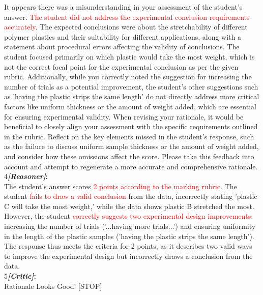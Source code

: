 \begin{figure*}
\begin{tcolorbox}[
    colback=gray!10,      %
    colframe=gray!80,     %
    title=Case Study 4,
    fonttitle=\bfseries,  %
    rounded corners,
    boxrule=0.5mm,        %
    width=\linewidth
]
 It appears there was a misunderstanding in your assessment of the student's answer. \textcolor{red}{The student did not address the experimental conclusion requirements accurately}. The expected conclusions were about the stretchability of different polymer plastics and their suitability for different applications, along with a statement about procedural errors affecting the validity of conclusions. The student focused primarily on which plastic would take the most weight, which is not the correct focal point for the experimental conclusion as per the given rubric. Additionally, while you correctly noted the suggestion for increasing the number of trials as a potential improvement, the student's other suggestions such as 'having the plastic strips the same length' do not directly address more critical factors like uniform thickness or the amount of weight added, which are essential for ensuring experimental validity. When revising your rationale, it would be beneficial to closely align your assessment with the specific requirements outlined in the rubric. Reflect on the key elements missed in the student's response, such as the failure to discuss uniform sample thickness or the amount of weight added, and consider how these omissions affect the score. Please take this feedback into account and attempt to regenerate a more accurate and comprehensive rationale.\\
\textcircled{\raisebox{-0.3pt} {\scriptsize4}}\textbf{\emph{[Reasoner]}:}\\
 The student's answer scores \textcolor{red}{2 points according to the marking rubric}. The student \textcolor{red}{fails to draw a valid conclusion} from the data, incorrectly stating 'plastic C will take the most weight,' while the data shows plastic B stretched the most. However, the student \textcolor{red}{correctly suggests two experimental design improvements}: increasing the number of trials ('...having more trials...') and ensuring uniformity in the length of the plastic samples ('having the plastic strips the same length'). The response thus meets the criteria for 2 points, as it describes two valid ways to improve the experimental design but incorrectly draws a conclusion from the data.\\
\textcircled{\raisebox{-0.3pt} {\scriptsize5}}\textbf{\emph{[Critic]}:}\\
 Rationale Looks Good! [STOP]
\end{tcolorbox}
\caption{\textbf{An example that Critic can identify intermediate errors even final scores are correct.}}
\label{box:correct_2}
\end{figure*}

